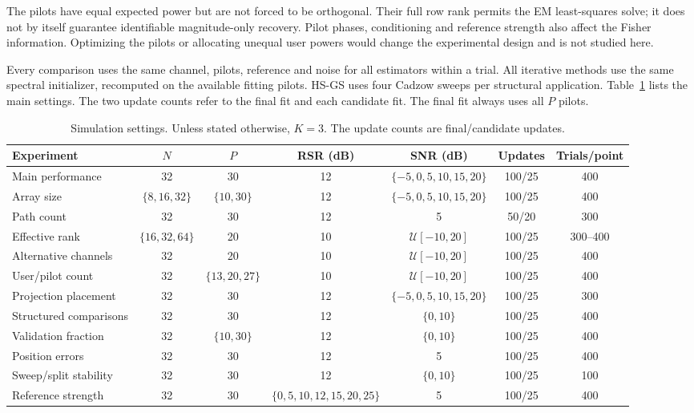 \documentclass[journal]{IEEEtran}
\begin{document}
The pilots have equal expected power but are not forced to be orthogonal.
Their full row rank permits the EM least-squares solve; it does not by
itself guarantee identifiable magnitude-only recovery. Pilot phases,
conditioning and reference strength also affect the Fisher information.
Optimizing the pilots or allocating unequal user powers would change the
experimental design and is not studied here.

Every comparison uses the same channel, pilots, reference and noise for
all estimators within a trial. All iterative methods use the same spectral
initializer, recomputed on the available fitting pilots. HS-GS uses four
Cadzow sweeps per structural application. Table~\ref{tab:config} lists the
main settings. The two update counts refer to the final fit and each
candidate fit. The final fit always uses all $P$ pilots.

\begin{table}[!t]
\caption{Simulation settings. Unless stated otherwise, $K=3$.
The update counts are final/candidate updates.}
\label{tab:config}
\centering
\footnotesize
\setlength{\tabcolsep}{5pt}
\begin{tabular}{lcccccc}
\toprule
Experiment & $N$ & $P$ & RSR (dB) & SNR (dB) & Updates & Trials/point\\
\midrule
Main performance & 32 & 30 & 12 & $\{-5,0,5,10,15,20\}$ & 100/25 & 400\\
Array size & $\{8,16,32\}$ & $\{10,30\}$ & 12 & $\{-5,0,5,10,15,20\}$ & 100/25 & 400\\
Path count & 32 & 30 & 12 & 5 & 50/20 & 300\\
Effective rank & $\{16,32,64\}$ & 20 & 10 & $\mathcal U[-10,20]$ & 100/25 & 300--400\\
Alternative channels & 32 & 20 & 10 & $\mathcal U[-10,20]$ & 100/25 & 400\\
User/pilot count & 32 & $\{13,20,27\}$ & 10 & $\mathcal U[-10,20]$ & 100/25 & 400\\
Projection placement & 32 & 30 & 12 & $\{-5,0,5,10,15,20\}$ & 100/25 & 300\\
Structured comparisons & 32 & 30 & 12 & $\{0,10\}$ & 100/25 & 400\\
Validation fraction & 32 & $\{10,30\}$ & 12 & $\{0,10\}$ & 100/25 & 400\\
Position errors & 32 & 30 & 12 & 5 & 100/25 & 400\\
Sweep/split stability & 32 & 30 & 12 & $\{0,10\}$ & 100/25 & 100\\
Reference strength & 32 & 30 & $\{0,5,10,12,15,20,25\}$ & 5 & 100/25 & 400\\
\bottomrule
\end{tabular}
\end{table}
\end{document}
